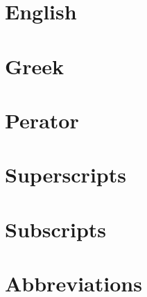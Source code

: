 \signary

\section*{English}

\section*{Greek}

\section*{Perator}

\section*{Superscripts}

\section*{Subscripts}

\section*{Abbreviations}


\lipsum[1-10]
